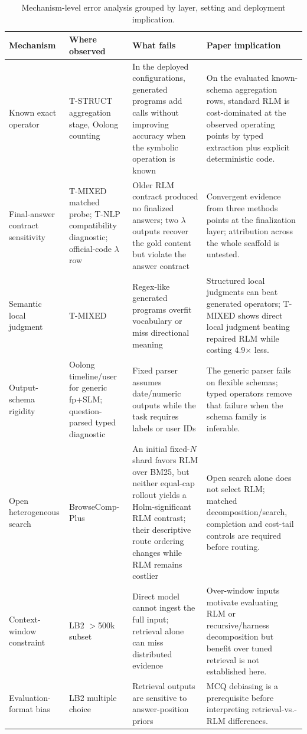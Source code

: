 \documentclass[letterpaper]{article}
\begin{document}
\begin{table}[t]
\centering
\small
\setlength{\tabcolsep}{4pt}
\begin{tabular}{@{}L{2.95cm}L{3.9cm}L{4.4cm}L{5.6cm}@{}}
\toprule
\textbf{Mechanism} & \textbf{Where observed} & \textbf{What fails} & \textbf{Paper implication} \\
\midrule
Known exact operator & T-STRUCT aggregation stage, Oolong counting & In the deployed configurations, generated programs add calls without improving accuracy when the symbolic operation is known & On the evaluated known-schema aggregation rows, standard RLM is cost-dominated at the observed operating points by typed extraction plus explicit deterministic code. \\
\addlinespace[3pt]
Final-answer contract sensitivity & T-MIXED matched probe; T-NLP compatibility diagnostic; official-code $\lambda$ row & Older RLM contract produced no finalized answers; two $\lambda$ outputs recover the gold content but violate the answer contract & Convergent evidence from three methods points at the finalization layer; attribution across the whole scaffold is untested. \\
\addlinespace[3pt]
Semantic local judgment & T-MIXED & Regex-like generated programs overfit vocabulary or miss directional meaning & Structured local judgments can beat generated operators; T-MIXED shows direct local judgment beating repaired RLM while costing 4.9$\times$ less. \\
\addlinespace[3pt]
Output-schema rigidity & Oolong timeline/user for generic fp+SLM; question-parsed typed diagnostic & Fixed parser assumes date/numeric outputs while the task requires labels or user IDs & The generic parser fails on flexible schemas; typed operators remove that failure when the schema family is inferable. \\
\addlinespace[3pt]
Open heterogeneous search & BrowseComp-Plus & An initial fixed-$N$ shard favors RLM over BM25, but neither equal-cap rollout yields a Holm-significant RLM contrast; their descriptive route ordering changes while RLM remains costlier & Open search alone does not select RLM; matched decomposition/search, completion and cost-tail controls are required before routing. \\
\addlinespace[3pt]
Context-window constraint & LB2 $>$500k subset & Direct model cannot ingest the full input; retrieval alone can miss distributed evidence & Over-window inputs motivate evaluating RLM or recursive/harness decomposition but benefit over tuned retrieval is not established here. \\
\addlinespace[3pt]
Evaluation-format bias & LB2 multiple choice & Retrieval outputs are sensitive to answer-position priors & MCQ debiasing is a prerequisite before interpreting retrieval-vs.-RLM differences. \\
\bottomrule
\end{tabular}
\caption{Mechanism-level error analysis grouped by layer, setting and deployment implication.}
\label{tab:mechanisms}
\end{table}
\end{document}
